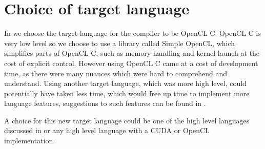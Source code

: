 \section{Choice of target language}
In  we choose the target language for the compiler to be OpenCL C.
OpenCL C is very low level so we choose to use a library called Simple OpenCL, which simplifies parts of OpenCL C, such as memory handling and kernel launch at the cost of explicit control. 
However using OpenCL C came at a cost of development time, as there were many nuances which were hard to comprehend and understand. 
Using another target language, which was more high level, could potentially have taken less time, which would free up time to implement more language features, suggestions to such features can be found in . 

A choice for this new target language could be one of the high level languages discussed in  or any high level language with a CUDA or OpenCL implementation.

